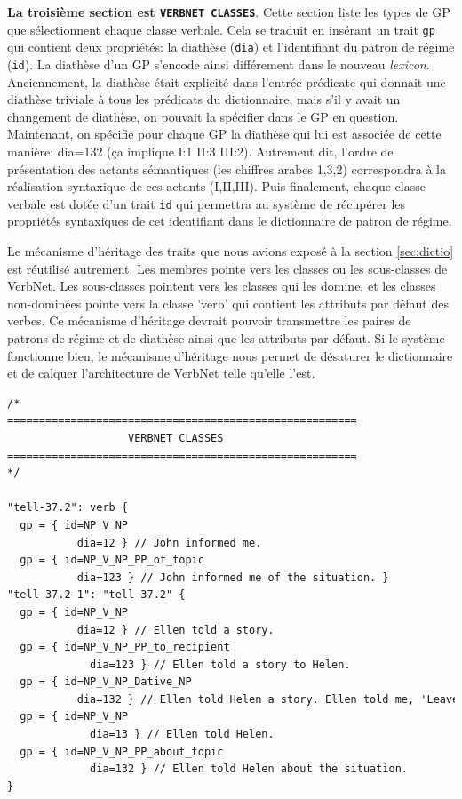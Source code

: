 \textbf{La troisième section est \texttt{VERBNET CLASSES}}. Cette section liste les types de \ac{GP} que sélectionnent chaque classe verbale. Cela se traduit en insérant un trait \texttt{gp} qui contient deux propriétés: la diathèse (\texttt{dia}) et l'identifiant du patron de régime (\texttt{id}). La diathèse d'un \ac{GP} s'encode ainsi différement dans le nouveau \emph{lexicon}. Anciennement, la diathèse était explicité dans l'entrée prédicate qui donnait une diathèse triviale à tous les prédicats du dictionnaire, mais s'il y avait un changement de diathèse, on pouvait la spécifier dans le \ac{GP} en question. Maintenant, on spécifie pour chaque \ac{GP} la diathèse qui lui est associée de cette manière: dia=132 (ça implique I:1 II:3 III:2). Autrement dit, l'ordre de présentation des actants sémantiques (les chiffres arabes 1,3,2) correspondra à la réalisation syntaxique de ces actants (I,II,III). Puis finalement, chaque classe verbale est dotée d'un trait \texttt{id} qui permettra au système de récupérer les propriétés syntaxiques de cet identifiant dans le dictionnaire de patron de régime.

Le mécanisme d'héritage des traits que nous avions exposé à la section \ref{sec:dictio} est réutilisé autrement. Les membres pointe vers les classes ou les sous-classes de VerbNet. Les sous-classes pointent vers les classes qui les domine, et les classes non-dominées pointe vers la classe 'verb' qui contient les attributs par défaut des verbes. Ce mécanisme d'héritage devrait pouvoir transmettre les paires de patrons de régime et de diathèse ainsi que les attributs par défaut. Si le système fonctionne bien, le mécanisme d'héritage nous permet de désaturer le dictionnaire et de calquer l'architecture de VerbNet telle qu'elle l'est.

\begin{minipage}{\linewidth}
\begin{lstlisting}[language=XML, caption = Partie: Classes de VerbNet]
/*
=======================================================
                   VERBNET CLASSES
=======================================================
*/

"tell-37.2": verb {
  gp = { id=NP_V_NP  
	       dia=12 } // John informed me.
  gp = { id=NP_V_NP_PP_of_topic  
	       dia=123 } // John informed me of the situation. }
"tell-37.2-1": "tell-37.2" {
  gp = { id=NP_V_NP  
	       dia=12 } // Ellen told a story.
  gp = { id=NP_V_NP_PP_to_recipient 
		     dia=123 } // Ellen told a story to Helen.
  gp = { id=NP_V_NP_Dative_NP   
	       dia=132 } // Ellen told Helen a story. Ellen told me, 'Leave the room.'
  gp = { id=NP_V_NP
		     dia=13 } // Ellen told Helen.
  gp = { id=NP_V_NP_PP_about_topic
		     dia=132 } // Ellen told Helen about the situation.
}
\end{lstlisting}
\end{minipage}

